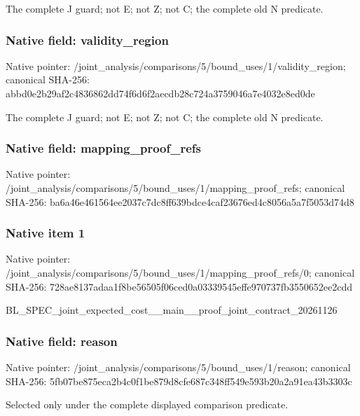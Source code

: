 \documentclass[10pt,a4paper]{article}
\begin{document}
The complete J guard; not E; not Z; not C; the complete old N predicate.


\subsubsection{Native field: validity\_region}


Native pointer: /joint\_analysis/comparis\allowbreak{}ons/5/bound\_uses/1/valid\allowbreak{}ity\_region; canonical SHA-256: abbd0e2b29af2c4836862dd7\allowbreak{}4f6d6f2aecdb28c724a37590\allowbreak{}46a7e4032e8ed0de


The complete J guard; not E; not Z; not C; the complete old N predicate.


\subsubsection{Native field: mapping\_proof\_refs}


Native pointer: /joint\_analysis/comparis\allowbreak{}ons/5/bound\_uses/1/mappi\allowbreak{}ng\_proof\_refs; canonical SHA-256: ba6a46e461564ee2037c7dc8\allowbreak{}ff639bdce4caf23676ed4c80\allowbreak{}56a5a7f5053d74d8



\subsubsection{Native item 1}


Native pointer: /joint\_analysis/comparis\allowbreak{}ons/5/bound\_uses/1/mappi\allowbreak{}ng\_proof\_refs/0; canonical SHA-256: 728ae8137adaa1f8be56505f\allowbreak{}06ced0a03339545effe97073\allowbreak{}7fb3550652ee2cdd


BL\_SPEC\_joint\_expected\_c\allowbreak{}ost\_\_main\_\_proof\_joint\_c\allowbreak{}ontract\_20261126


\subsubsection{Native field: reason}


Native pointer: /joint\_analysis/comparis\allowbreak{}ons/5/bound\_uses/1/reaso\allowbreak{}n; canonical SHA-256: 5fb07be875eca2b4c0f1be87\allowbreak{}9d8cfe687c348ff549e593b2\allowbreak{}0a2a91ea43b3303c


Selected only under the complete displayed comparison predicate.
\end{document}
